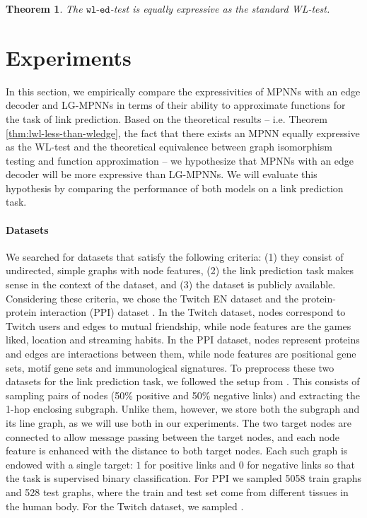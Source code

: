 \documentclass{article}
\newtheorem{theorem}{Theorem}
\newcommand{\wledge}{\texttt{wl-ed}}
\begin{document}
\begin{theorem} \label{thm:wledge-equal-to-wl}
    The $\wledge$-test is equally expressive as the standard WL-test.
\end{theorem}



\section{Experiments}

In this section, we empirically compare the expressivities of MPNNs with an edge decoder and LG-MPNNs in terms of their ability to approximate functions for the task of link prediction.
Based on the theoretical results -- i.e. Theorem \ref{thm:lwl-less-than-wledge}, the fact that there exists an MPNN equally expressive as the WL-test \cite{xu2018powerful} and the theoretical equivalence between graph isomorphism testing and function approximation \cite{chen2019equivalence} -- we hypothesize that MPNNs with an edge decoder will be more expressive than LG-MPNNs. We will evaluate this hypothesis by comparing the performance of both models on a link prediction task.

\paragraph{Datasets} We searched for datasets that satisfy the following criteria: (1) they consist of undirected, simple graphs with node features, (2) the link prediction task makes sense in the context of the dataset, and (3) the dataset is publicly available. Considering these criteria, we chose the Twitch EN dataset \cite{rozemberczki2021multiscale} and the 
protein-protein interaction (PPI) dataset \cite{zitnik2017predicting}. In the Twitch dataset, nodes correspond to Twitch users and edges to mutual friendship, while node features are the games liked, location and streaming habits. In the PPI dataset, nodes represent proteins and edges are interactions between them, while node features are positional gene sets, motif gene sets and immunological signatures.
To preprocess these two datasets for the link prediction task, we followed the setup from \cite{cai2021line}. This consists of sampling pairs of nodes (50\% positive and 50\% negative links) and extracting the 1-hop enclosing subgraph. Unlike them, however, we store both the subgraph and its line graph, as we will use both in our experiments. The two target nodes are connected to allow message passing between the target nodes, and each node feature is enhanced with the distance to both target nodes. Each such graph is endowed with a single target: $1$ for positive links and $0$ for negative links so that the task is supervised binary classification.
For PPI we sampled 5058 train graphs and 528 test graphs, where the train and test set come from different tissues in the human body. For the Twitch dataset, we sampled . 
\end{document}
